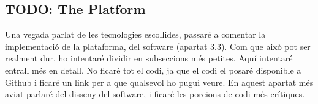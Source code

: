 
\subsection{TODO: The Platform}

Una vegada parlat de les tecnologies escollides, passaré a comentar la
implementació de la plataforma, del software (apartat 3.3). Com que això pot
ser realment dur, ho intentaré dividir en subseccions més petites. Aquí
intentaré entrall més en detall. No ficaré tot el codi, ja que el codi el
posaré disponible a Github i ficaré un link per a que qualsevol ho pugui veure.
En aquest apartat més aviat parlaré del disseny del software, i ficaré les
porcions de codi més crítiques.